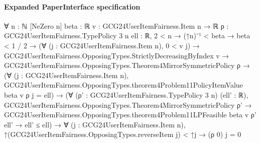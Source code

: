 \documentclass[10pt]{article}
\begin{document}
\paragraph{Expanded PaperInterface specification}
\begin{ReviewVerbatim}
∀ {n : ℕ} [NeZero n] {beta : ℝ} {v : GCG24UserItemFairness.Item n → ℝ} {ρ : GCG24UserItemFairness.TypePolicy 3 n}
  {ell : ℝ},
  2 < n →
    (↑n)⁻¹ < beta →
      beta < 1 / 2 →
        (∀ (j : GCG24UserItemFairness.Item n), 0 < v j) →
          GCG24UserItemFairness.OpposingTypes.StrictlyDecreasingByIndex v →
            GCG24UserItemFairness.OpposingTypes.Theorem4MirrorSymmetricPolicy ρ →
              (∀ (j : GCG24UserItemFairness.Item n),
                  GCG24UserItemFairness.OpposingTypes.theorem4Problem11PolicyItemValue beta v ρ j = ell) →
                (∀ (ρ' : GCG24UserItemFairness.TypePolicy 3 n) (ell' : ℝ),
                    GCG24UserItemFairness.OpposingTypes.Theorem4MirrorSymmetricPolicy ρ' →
                      GCG24UserItemFairness.OpposingTypes.theorem4Problem11LPFeasible beta v ρ' ell' → ell' ≤ ell) →
                  ∀ (j : GCG24UserItemFairness.Item n),
                    ↑(GCG24UserItemFairness.OpposingTypes.reverseItem j) < ↑j → (ρ 0) j = 0
\end{ReviewVerbatim}
\end{document}
